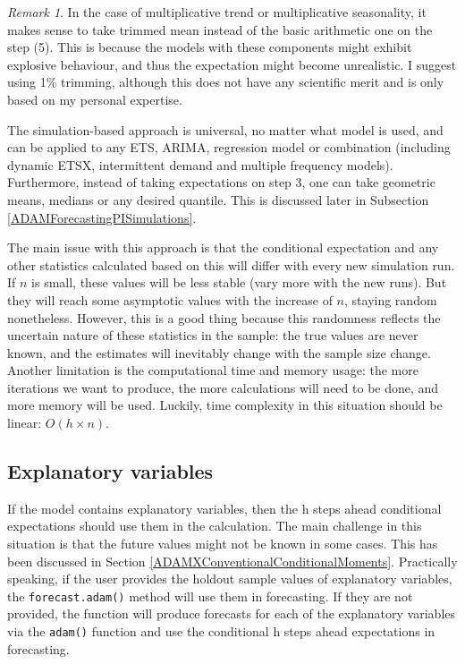 \documentclass[]{book}
\theoremstyle{definition}
\theoremstyle{definition}
\theoremstyle{definition}
\theoremstyle{definition}
\theoremstyle{remark}
\newtheorem*{remark}{Remark}
\begin{document}
\begin{remark}
In the case of multiplicative trend or multiplicative seasonality, it makes sense to take trimmed mean instead of the basic arithmetic one on the step (5). This is because the models with these components might exhibit explosive behaviour, and thus the expectation might become unrealistic. I suggest using 1\% trimming, although this does not have any scientific merit and is only based on my personal expertise.
\end{remark}

The simulation-based approach is universal, no matter what model is used, and can be applied to any ETS, ARIMA, regression model or combination (including dynamic ETSX, intermittent demand and multiple frequency models). Furthermore, instead of taking expectations on step 3, one can take geometric means, medians or any desired quantile. This is discussed later in Subsection \ref{ADAMForecastingPISimulations}.

The main issue with this approach is that the conditional expectation and any other statistics calculated based on this will differ with every new simulation run. If \(n\) is small, these values will be less stable (vary more with the new runs). But they will reach some asymptotic values with the increase of \(n\), staying random nonetheless. However, this is a good thing because this randomness reflects the uncertain nature of these statistics in the sample: the true values are never known, and the estimates will inevitably change with the sample size change. Another limitation is the computational time and memory usage: the more iterations we want to produce, the more calculations will need to be done, and more memory will be used. Luckily, time complexity in this situation should be linear: \(O(h \times n)\).

\hypertarget{explanatory-variables}{%
\subsection{Explanatory variables}\label{explanatory-variables}}

If the model contains explanatory variables, then the h steps ahead conditional expectations should use them in the calculation. The main challenge in this situation is that the future values might not be known in some cases. This has been discussed in Section \ref{ADAMXConventionalConditionalMoments}. Practically speaking, if the user provides the holdout sample values of explanatory variables, the \texttt{forecast.adam()} method will use them in forecasting. If they are not provided, the function will produce forecasts for each of the explanatory variables via the \texttt{adam()} function and use the conditional h steps ahead expectations in forecasting.
\end{document}
